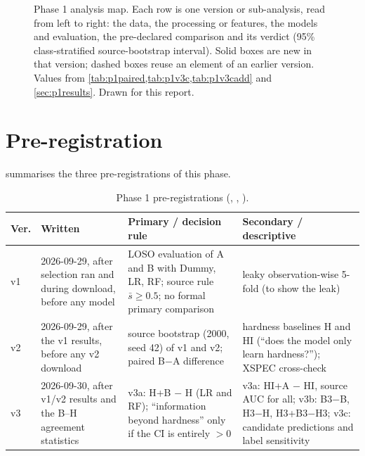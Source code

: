 \begin{figure}[htbp]
\centering

\caption[Phase 1 analysis map]{Phase 1 analysis map. Each row is one version or sub-analysis, read from left to right: the
data, the processing or features, the models and evaluation, the pre-declared comparison and its verdict (95\%
class-stratified source-bootstrap interval). Solid boxes are new in that version; dashed boxes reuse an element of an
earlier version. Values from \cref{tab:p1paired,tab:p1v3c,tab:p1v3cadd} and \cref{sec:p1results}. Drawn for this
report.}
\label{fig:p1flow}
\end{figure}

\section{Pre-registration}
 summarises the three pre-registrations of this phase.

\begin{table}[htbp]
\centering\small
\caption[Phase 1 pre-registrations]{Phase 1 pre-registrations (, , ).}
\label{tab:p1prereg}
\begin{tabularx}{\textwidth}{@{}p{0.8cm}p{3.0cm}XX@{}}
\toprule
Ver. & Written & Primary / decision rule & Secondary / descriptive \\
\midrule
v1 & 2026-09-29, after selection ran and during download, before any model & LOSO evaluation of A and B with Dummy, LR, RF; source rule $\bar s\ge0.5$; no formal primary comparison & leaky observation-wise 5-fold (to show the leak) \\
v2 & 2026-09-29, after the v1 results, before any v2 download & source bootstrap (2000, seed 42) of v1 and v2; paired B$-$A difference & hardness baselines H and HI (``does the model only learn hardness?''); XSPEC cross-check \\
v3 & 2026-09-30, after v1/v2 results and the B--H agreement statistics & v3a: H+B $-$ H (LR and RF); ``information beyond hardness'' only if the CI is entirely $>0$ & v3a: HI+A $-$ HI, source AUC for all; v3b: B3$-$B, H3$-$H, H3+B3$-$H3; v3c: candidate predictions and label sensitivity \\
\bottomrule
\end{tabularx}
\end{table}

